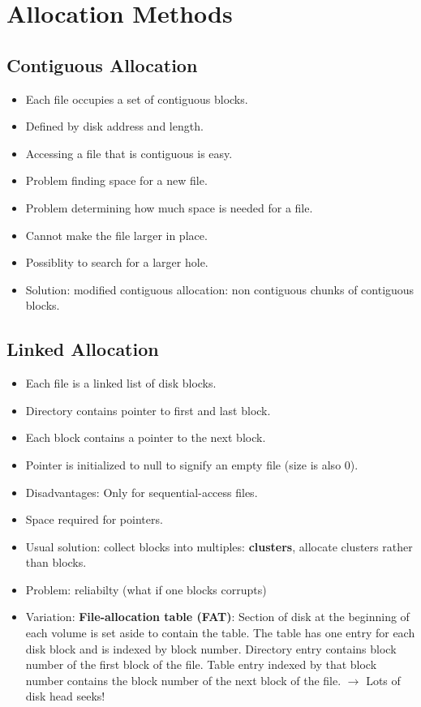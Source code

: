 \documentclass[10pt]{report}
\begin{document}
	\section{Allocation Methods}
		\subsection{Contiguous Allocation}
			\begin{itemize}
				\item Each file occupies a set of contiguous blocks.
				\item Defined by disk address and length.
				\item Accessing a file that is contiguous is easy.
				\item Problem finding space for a new file.
				\item Problem determining how much space is needed for a file.
				\item Cannot make the file larger in place.
				\item Possiblity to search for a larger hole.
				\item Solution: modified contiguous allocation: non contiguous chunks of contiguous blocks.
			\end{itemize}

		\subsection{Linked Allocation}
			\begin{itemize}
				\item Each file is a linked list of disk blocks.
				\item Directory contains pointer to first and last block.
				\item Each block contains a pointer to the next block.
				\item Pointer is initialized to null to signify an empty file (size is also 0).
				\item Disadvantages: Only for sequential-access files.
				\item Space required for pointers.
				\item Usual solution: collect blocks into multiples: \textbf{clusters}, allocate clusters rather than blocks.
				\item Problem: reliabilty (what if one blocks corrupts)
				\item Variation: \textbf{File-allocation table (FAT)}: Section of disk at the beginning of each volume is set aside to contain the table. The table has one entry for each disk block and is indexed by block number. Directory entry contains block number of the first block of the file. Table entry indexed by that block number contains the block number of the next block of the file. $\rightarrow$ Lots of disk head seeks!
			\end{itemize}
\end{document}

